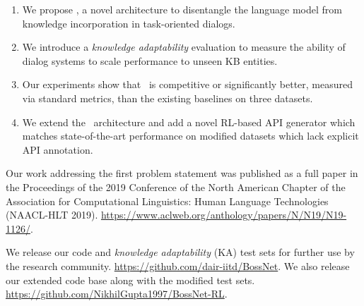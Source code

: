 \begin{enumerate}
 \item We propose \sys, a novel architecture to disentangle the language model from knowledge incorporation in task-oriented dialogs.
 \item We introduce a {\em knowledge adaptability} evaluation to measure the ability of dialog systems to scale performance to unseen KB entities.
 \item Our experiments show that \sys\ is competitive or significantly better, measured via standard metrics, than the existing baselines on three datasets.
 \item We extend the \sys\ architecture and add a novel RL-based API generator which matches state-of-the-art performance on modified datasets which lack explicit API annotation.
\end{enumerate}

Our work addressing the first problem statement was published as a full paper in the Proceedings of the 2019 Conference of the North American Chapter of the Association for Computational Linguistics: Human Language Technologies (NAACL-HLT 2019). \url{https://www.aclweb.org/anthology/papers/N/N19/N19-1126/}.

We release our code and {\em knowledge adaptability} (KA) test sets for further use by the research community. \url{ https://github.com/dair-iitd/BossNet}. We also release our extended code base along with the modified test sets. \url{ https://github.com/NikhilGupta1997/BossNet-RL}.

